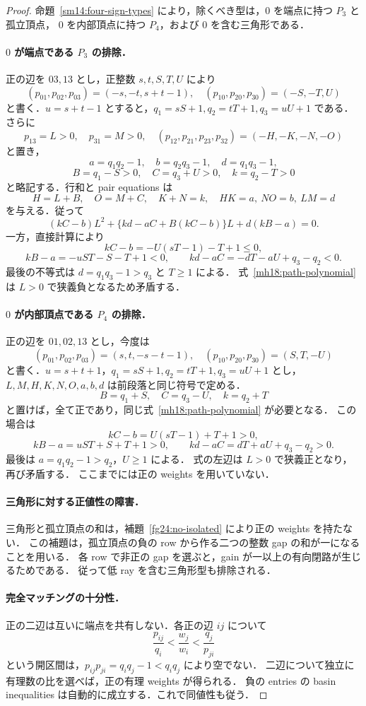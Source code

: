 \begin{proof}
命題~\ref{sm14:four-sign-types} により，除くべき型は，$0$ を端点に持つ $P_3$ と孤立頂点，
$0$ を内部頂点に持つ $P_4$，および $0$ を含む三角形である．

\paragraph{$0$ が端点である $P_3$ の排除．}
正の辺を $03,13$ とし，正整数 $s,t,S,T,U$ により
\[
 (p_{01},p_{02},p_{03})=(-s,-t,s+t-1),\quad
 (p_{10},p_{20},p_{30})=(-S,-T,U)
\]
と書く．$u=s+t-1$ とすると，$q_1=sS+1,q_2=tT+1,q_3=uU+1$ である．
さらに
\[
 p_{13}=L>0,\quad p_{31}=M>0,\quad
 (p_{12},p_{21},p_{23},p_{32})=(-H,-K,-N,-O)
\]
と置き，
\[
 a=q_1q_2-1,\quad b=q_2q_3-1,\quad d=q_1q_3-1,
\]
\[
 B=q_1-S>0,\quad C=q_3+U>0,\quad k=q_2-T>0
\]
と略記する．行和と pair equations は
\[
 H=L+B,\quad O=M+C,\quad K+N=k,\quad
 HK=a,\ NO=b,\ LM=d
\]
を与える．従って
\begin{equation}\label{mh18:path-polynomial}
 (kC-b)L^2+\{kd-aC+B(kC-b)\}L+d(kB-a)=0.
\end{equation}
一方，直接計算により
\[
 kC-b=-U(sT-1)-T+1\le0,
\]
\[
 kB-a=-uST-S-T+1<0,\qquad
 kd-aC=-dT-aU+q_3-q_2<0.
\]
最後の不等式は $d=q_1q_3-1>q_3$ と $T\ge1$ による．
式~\eqref{mh18:path-polynomial} は $L>0$ で狭義負となるため矛盾する．

\paragraph{$0$ が内部頂点である $P_4$ の排除．}
正の辺を $01,02,13$ とし，今度は
\[
 (p_{01},p_{02},p_{03})=(s,t,-s-t-1),\quad
 (p_{10},p_{20},p_{30})=(S,T,-U)
\]
と書く．$u=s+t+1$，$q_1=sS+1,q_2=tT+1,q_3=uU+1$ とし，
$L,M,H,K,N,O,a,b,d$ は前段落と同じ符号で定める．
\[
 B=q_1+S,\quad C=q_3-U,\quad k=q_2+T
\]
と置けば，全て正であり，同じ式~\eqref{mh18:path-polynomial} が必要となる．
この場合は
\[
 kC-b=U(sT-1)+T+1>0,
\]
\[
 kB-a=uST+S+T+1>0,\qquad
 kd-aC=dT+aU+q_3-q_2>0.
\]
最後は $a=q_1q_2-1>q_2$，$U\ge1$ による．
式の左辺は $L>0$ で狭義正となり，再び矛盾する．
ここまでには正の weights を用いていない．

\paragraph{三角形に対する正値性の障害．}
三角形と孤立頂点の和は，補題~\ref{fg24:no-isolated} により正の weights を持たない．
この補題は，孤立頂点の負の row から作る二つの整数 gap の和が一になることを用いる．
各 row で非正の gap を選ぶと，gain が一以上の有向閉路が生じるためである．
従って低 ray を含む三角形型も排除される．

\paragraph{完全マッチングの十分性．}
正の二辺は互いに端点を共有しない．各正の辺 $ij$ について
\[
 \frac{p_{ij}}{q_i}<\frac{w_j}{w_i}<\frac{q_j}{p_{ji}}
\]
という開区間は，$p_{ij}p_{ji}=q_iq_j-1<q_iq_j$ により空でない．
二辺について独立に有理数の比を選べば，正の有理 weights が得られる．
負の entries の basin inequalities は自動的に成立する．これで同値性も従う．
\end{proof}

